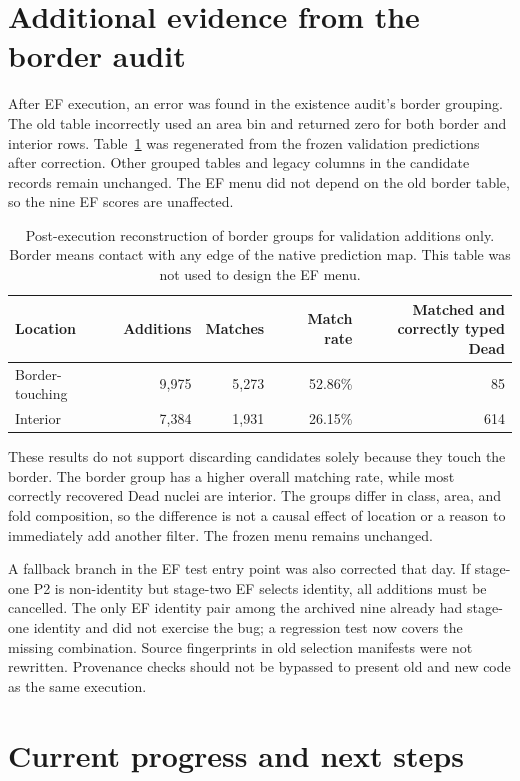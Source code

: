 \documentclass[11pt,a4paper]{article}
\begin{document}
\section{Additional evidence from the border audit}

After EF execution, an error was found in the existence audit's border grouping. The old table incorrectly used an area bin and returned zero for both border and interior rows. Table~\ref{tab:border} was regenerated from the frozen validation predictions after correction. Other grouped tables and legacy columns in the candidate records remain unchanged. The EF menu did not depend on the old border table, so the nine EF scores are unaffected.

\begin{table}[H]
\centering\small
\caption{Post-execution reconstruction of border groups for validation additions only. Border means contact with any edge of the native prediction map. This table was not used to design the EF menu.}
\label{tab:border}
\begin{tabular}{lrrrr}\toprule
Location & Additions & Matches & Match rate & \shortstack{Matched and\\correctly typed Dead}\\\midrule
Border-touching & 9,975 & 5,273 & 52.86\% & 85\\
Interior & 7,384 & 1,931 & 26.15\% & 614\\\bottomrule
\end{tabular}
\end{table}

These results do not support discarding candidates solely because they touch the border. The border group has a higher overall matching rate, while most correctly recovered Dead nuclei are interior. The groups differ in class, area, and fold composition, so the difference is not a causal effect of location or a reason to immediately add another filter. The frozen menu remains unchanged.

A fallback branch in the EF test entry point was also corrected that day. If stage-one P2 is non-identity but stage-two EF selects identity, all additions must be cancelled. The only EF identity pair among the archived nine already had stage-one identity and did not exercise the bug; a regression test now covers the missing combination. Source fingerprints in old selection manifests were not rewritten. Provenance checks should not be bypassed to present old and new code as the same execution.

\section{Current progress and next steps}
\end{document}
